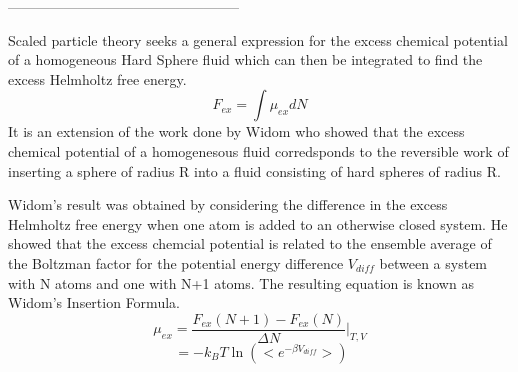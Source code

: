 \documentclass[12pt]{article}
\begin{document}


--------------------------------------------------

Scaled particle theory seeks a general expression for the excess chemical potential of a homogeneous Hard Sphere fluid 
which can then be integrated to find the excess Helmholtz free energy.
\begin{equation}F_{ex}=\int{\mu_{ex}dN}\end{equation}
It is an extension of the work done by Widom who showed that the excess chemical potential of a homogenesous fluid corredsponds to the reversible work 
of inserting a sphere of radius R into a fluid consisting of hard spheres of radius R. 

Widom's result was obtained by considering the difference in the excess Helmholtz free energy when one atom is added to an otherwise closed system. 
He showed that the excess chemcial potential is related to the ensemble average of the Boltzman factor for the potential energy difference $V_{diff}$ 
between a system with N atoms and one with N+1 atoms. The resulting equation is known as Widom's Insertion Formula.
\begin{equation}\mu_{ex}=\frac{F_{ex}(N+1)-F_{ex}(N)}{\Delta{N}}\bigg|_{T,V}\end{equation}
\begin{equation}\label{widoms-insertion-formula}{~}=-k_BT\ln\left(<e^{-\beta{V_{diff}}}>\right)\end{equation}

\end{document}
